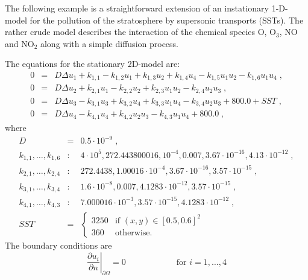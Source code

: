 \documentclass[11pt]{article}
\begin{document}
The following example is a straightforward extension of an instationary
1-D-model for the pollution of the stratosphere by supersonic transports
(SSTs). The rather crude model
describes the interaction of the chemical species O, O$_3$,
NO and NO$_2$ along with a simple diffusion process. \par
The equations for the stationary 2D-model are:
\begin{equation} \label{PDESST} 
\begin{array}{rcl}
  0 & = & D \Delta u_1 + k_{1,1} - k_{1,2}u_1 + k_{1,3}u_2 + k_{1,4}u_4
          - k_{1,5}u_1u_2 - k_{1,6}u_1u_4 \; , \\[2mm]
  0 & = & D \Delta u_2 + k_{2,1}u_1 - k_{2,2}u_2 + k_{2,3}u_1u_2 -
          k_{2,4}u_2u_3 \; , \\[2mm]
  0 & = & D \Delta u_3 - k_{3,1}u_3 + k_{3,2}u_4 + k_{3,3}u_1u_4 -
          k_{3,4}u_2u_3 + 800.0 + SST  \; , \\[2mm]
  0 & = & D \Delta u_4 - k_{4,1}u_4 + k_{4,2}u_2u_3 -
          k_{4,3}u_1u_4 + 800.0   \; , 
\end{array}
\end{equation}
where
\[ \begin{array}{lcl}
  D & = & 0.5 \cdot 10^{-9}   \; , \\[2mm]  
  k_{1,1},\ldots,k_{1,6} & : & 
  4\cdot 10^5, 272.443800016, 10^{-4}, 0.007, 3.67\cdot 10^{-16}, 4.13\cdot
  10^{-12}  \; , \\[2mm] 
  k_{2,1},\ldots,k_{2,4} & : & 
  272.4438, 1.00016\cdot 10^{-4}, 3.67\cdot 10^{-16}, 3.57\cdot 10^{-15}  \;
  , \\[2mm]
  k_{3,1},\ldots,k_{3,4} & : & 
  1.6\cdot 10^{-8}, 0.007, 4.1283\cdot 10^{-12}, 3.57\cdot 10^{-15} \; ,
  \\[2mm]
  k_{4,1},\ldots,k_{4,3} & : & 
  7.000016\cdot 10^{-3}, 3.57\cdot 10^{-15}, 4.1283\cdot 10^{-12} \; , \\[2mm]
  SST & = & \left \{ \begin{array}{ll}
            3250 & \mbox{if \  } (x,y)\in [0.5,0.6]^2 \\
             360 & \mbox{otherwise.}
            \end{array} \right . 
\end{array} \]
The boundary conditions are
\begin{equation} \label{SSTboundary}
  \left . \frac{\partial u_i}{\partial n} \right |_{\partial \Omega} = 0 
  \hspace{6em} \mbox{for \  } i=1,\ldots,4 
\end{equation}
\end{document}
